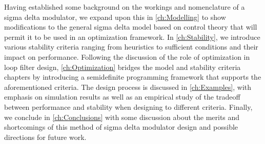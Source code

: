 Having established some background on the workings and nomenclature of a sigma delta modulator, we expand upon this in \autoref{ch:Modelling} to show modifications to the general sigma delta model based on control theory that will permit it to be used in an optimization framework. In \autoref{ch:Stability}, we introduce various stability criteria ranging from heuristics to sufficient conditions and their impact on performance. Following the discussion of the role of optimization in loop filter design, \autoref{ch:Optimization} bridges the model and stability criteria chapters by introducing a semidefinite programming framework that supports the aforementioned criteria. The design process is discussed in \autoref{ch:Examples}, with emphasis on simulation results as well as an empirical study of the tradeoff between performance and stability when designing to different criteria. Finally, we conclude in \autoref{ch:Conclusions} with some discussion about the merits and shortcomings of this method of sigma delta modulator design and possible directions for future work.

\endinput

Any text after an \endinput is ignored.
You could put scraps here or things in progress.
